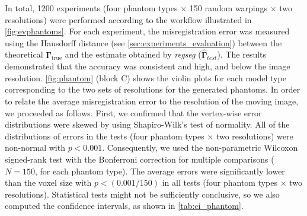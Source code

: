 \documentclass[3p,authoryear,fleqn]{elsarticle}
\providecommand{\gammaset}{\ensuremath{\boldsymbol{\Gamma}}}
\providecommand{\regseg}{\emph{regseg}}
\providecommand{\Regseg}{\emph{Regseg}}
\begin{document}
\begin{figure*}
  \centering
  
  \caption{A. Visual assessment of the results obtained with the low resolution sets:
    ``gyrus'' (top left), ``L'' (top right), ``ball'' (bottom left),
    and ``box'' at (bottom right).
  The contours recovered after registration are represented in yellow.
  \Regseg{} achieved high accuracy because it determined the almost exact locations of the registered
    contours with respect to their ground truth positions (shown in green).
  The partial volume effect makes segmentation of the sulci a challenging problem with voxel-wise
    clustering methods, but they were successfully segmented with \regseg{}.
  B. Quantitative evaluation of registration errors in terms of the average Hausdorff distances between
    surfaces at low (left) and high (right) resolutions, which demonstrate that the errors were
    consistently below the size of the voxels.
    }\label{fig:phantom}
\end{figure*}
In total, 1200 experiments (four phantom types $\times$ 150 random warpings $\times$ two resolutions) were
  performed according to the workflow illustrated in \autoref{fig:evphantoms}.
For each experiment, the misregistration error was measured using the Hausdorff distance
  (see \autoref{sec:experiments_evaluation}) between the theoretical $\gammaset_\text{true}$ and
  the estimate obtained by \regseg{} ($\hat{\gammaset}_{test}$).
The results demonstrated that the accuracy was consistent and high, and below the image resolution.
\autoref{fig:phantom} (block C) shows the violin plots for each model type corresponding
  to the two sets of resolutions for the generated phantoms.
In order to relate the average misregistration error to the resolution of the moving image,
  we proceeded as follows.
First, we confirmed that the vertex-wise error distributions were skewed by using Shapiro-Wilk's test of
  normality.
All of the distributions of errors in the tests (four phantom types $\times$ two resolutions) were
  non-normal with $p<0.001$.
Consequently, we used the non-parametric Wilcoxon signed-rank test with the Bonferroni
  correction for multiple comparisons ($N=150$, for each phantom type).
The average errors were significantly lower than the voxel size with $p < (0.001 / 150)$
  in all tests (four phantom types $\times$ two resolutions).
Statistical tests might not be sufficiently conclusive, so we also computed the confidence intervals,
  as shown in \autoref{tab:ci_phantom}.
\end{document}
